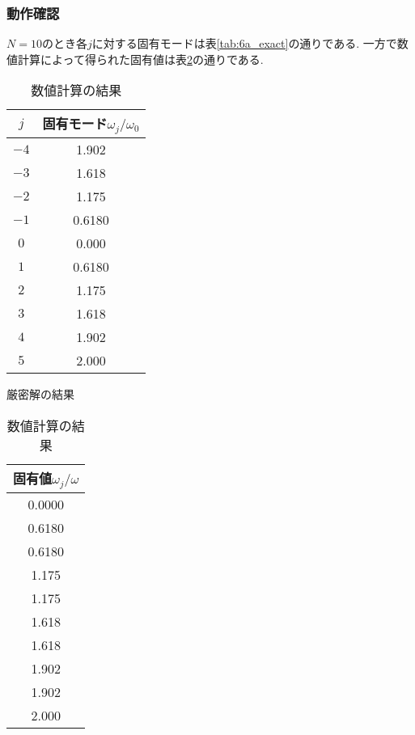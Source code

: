 \subsubsection{動作確認}
$N=10$のとき各$j$に対する固有モードは表\ref{tab:6a_exact}の通りである.
一方で数値計算によって得られた固有値は表\ref{tab:6a_num}の通りである.
\begin{table}[h]
  \begin{minipage}[t]{.45\textwidth}
    \begin{center}
      \begin{tabular}{cc}
        \hline
        $j$&固有モード$\omega_j/\omega_0$\\
        \hline \hline
        $-4$& 1.902 \\
        $-3$& 1.618 \\
        $-2$& 1.175 \\
        $-1$& 0.6180\\
        $0 $& 0.000 \\
        $1 $& 0.6180\\    
        $2 $& 1.175 \\  
        $3 $& 1.618 \\  
        $4 $& 1.902 \\  
        $5 $& 2.000 \\  
        \hline
      \end{tabular}
    \end{center}
    \caption{厳密解の結果}
    \label{tab:6a_exact}
  \end{minipage}
  \hfill
  \begin{minipage}[t]{.45\textwidth}
    \begin{center}
      \begin{tabular}{c}
        \hline
        固有値$\omega_j/\omega$\\
        \hline \hline
        0.0000\\
        0.6180\\
        0.6180\\
        1.175\\
        1.175\\
        1.618\\
        1.618\\
        1.902\\
        1.902\\
        2.000\\
        \hline
      \end{tabular}
    \end{center}
    \caption{数値計算の結果}
    \label{tab:6a_num}
  \end{minipage}
\end{table}
\newpage
